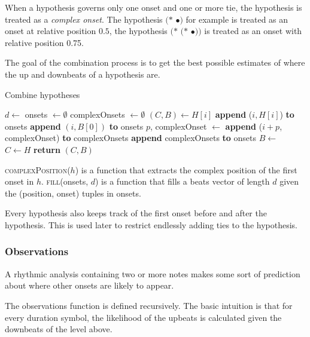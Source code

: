 When a hypothesis governs only one onset and one or more tie, the hypothesis is treated as a \textit{complex onset}. The hypothesis $(*$ $\bullet)$ for example is treated as an onset at relative position $0.5$, the hypothesis $(*$ $(*$ $\bullet))$ is treated as an onset with relative position 0.75.

The goal of the combination process is to get the best possible estimates of where the up and downbeats of a hypothesis are. 
\begin{algorithm}
\caption{Combine hypotheses}
\label{alg:combination}
\begin{algorithmic}
	\State $d \leftarrow$ 
	\State onsets $\leftarrow \emptyset$
	\State complexOnsets $\leftarrow \emptyset$
		\State $(C, B) \leftarrow H[i]$
			\State \textbf{append} ($i, H[i]$) \textbf{to} onsets
		\Else
				\State \textbf{append} $(i, B[0])$ \textbf{to} onsets
			\Else
				\State $p$, complexOnset $\leftarrow$ 
				\State \textbf{append} ($i + p$, complexOnset) \textbf{to} complexOnsets
			\EndIf
		\EndIf
	\EndFor
		\State \textbf{append} complexOnsets \textbf{to} onsets
	\EndIf
	\State $B \leftarrow$ 
	\State $C \leftarrow H$
	\State \textbf{return} $(C, B)$
\EndFunction
\end{algorithmic}
\end{algorithm}

\textsc{complexPosition}($h$) is a function that extracts the complex position of the first onset in $h$. \textsc{fill}(onsets, $d$) is a function that fills a beats vector of length $d$ given the (position, onset) tuples in onsets.

Every hypothesis also keeps track of the first onset before and after the hypothesis. This is used later to restrict endlessly adding ties to the hypothesis.

\subsubsection{Observations}


A rhythmic analysis containing two or more notes makes some sort of prediction about where other onsets are likely to appear. 

The observations function is defined recursively. The basic intuition is that for every duration symbol, the likelihood of the upbeats is calculated given the downbeats of the level above. 


